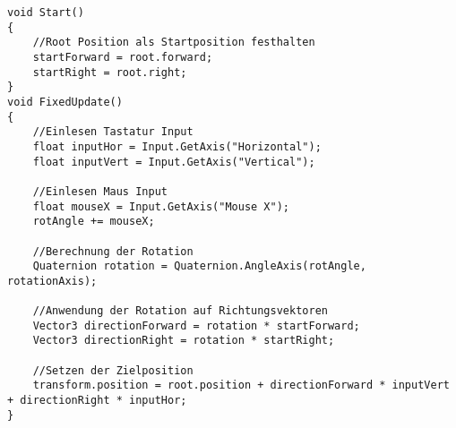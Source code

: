 \begin{lstlisting}[caption={Erweiterung der Nutzersteuerung mit separater Blickrichtung},captionpos=b,label={lst:nutzersteuerung_3}]
void Start()
{
    //Root Position als Startposition festhalten
    startForward = root.forward;
    startRight = root.right;
}
void FixedUpdate()
{
    //Einlesen Tastatur Input
    float inputHor = Input.GetAxis("Horizontal");
    float inputVert = Input.GetAxis("Vertical");

    //Einlesen Maus Input
    float mouseX = Input.GetAxis("Mouse X");
    rotAngle += mouseX;

    //Berechnung der Rotation
    Quaternion rotation = Quaternion.AngleAxis(rotAngle, rotationAxis);

    //Anwendung der Rotation auf Richtungsvektoren
    Vector3 directionForward = rotation * startForward;
    Vector3 directionRight = rotation * startRight;

    //Setzen der Zielposition
    transform.position = root.position + directionForward * inputVert + directionRight * inputHor;
}
\end{lstlisting}